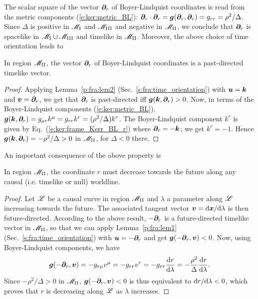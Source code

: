 The scalar square of the vector $\bm{\partial}_r$ of Boyer-Lindquist coordinates
is read from the metric components (\ref{e:ker:metric_BL}):
$\bm{\partial}_r \cdot \bm{\partial}_r = \bm{g}(\bm{\partial}_r,\bm{\partial}_r) = g_{rr} = \rho^2 / \Delta$. Since $\Delta$ is
positive in $\mathscr{M}_{\rm I}$ and $\mathscr{M}_{\rm III}$ and negative in $\M_{\rm II}$,
we conclude that $\bm{\partial}_r$ is spacelike in $\mathscr{M}_{\rm I}\cup \mathscr{M}_{\rm III}$
and timelike in $\M_{\rm II}$. Moreover, the above choice of time orientation leads to
\begin{prop}
In region $\M_{\rm II}$, the vector $\bm{\partial}_r$ of Boyer-Lindquist coordinates
is a past-directed timelike vector.
\end{prop}
\begin{proof}
Applying Lemma~\ref{p:fra:lem2} (Sec.~\ref{s:fra:time_orientation}) with $\bm{u}=\bm{k}$ and
$\bm{v} = \bm{\partial}_r$, we get that $\bm{\partial}_r$ is past-directed iff $\bm{g}(\bm{k},\bm{\partial}_r) > 0$.
Now, in terms of the Boyer-Lindquist components (\ref{e:ker:metric_BL}),
$\bm{g}(\bm{k},\bm{\partial}_r) = g_{\mu r} k^\mu = g_{rr} k^r = (\rho^2 / \Delta) k^r$.
The Boyer-Lindquist component $k^r$ is given by Eq.~(\ref{e:ker:frame_Kerr_BL_r}) where
$\bm{\partial}_{\hat{r}} = - \bm{k}$; we get $k^r = -1$. Hence $\bm{g}(\bm{k},\bm{\partial}_r) = - \rho^2 /\Delta > 0$
in $\M_{\rm II}$, for $\Delta < 0$ there.
\end{proof}

An important consequence of the above property is
\begin{prop}[decreasing of $r$ in $\M_{\rm II}$]
\label{p:ker:r_decreasing_M_II}
In region $\M_{\rm II}$, the coordinate $r$ must decrease towards the future
along any causal (i.e. timelike or null) worldline.
\end{prop}
\begin{proof}
Let $\mathscr{L}$ be a causal curve in region $\M_{\rm II}$ and $\lambda$ a parameter
along $\mathscr{L}$ increasing towards the future. The associated tangent vector
$\bm{v} = \mathrm{d}\bm{x}/\mathrm{d}\lambda$ is then future-directed.
According to the above result, $-\bm{\partial}_r$ is a future-directed timelike vector
in $\M_{\rm II}$, so that we can  apply Lemma~\ref{p:fra:lem1} (Sec.~\ref{s:fra:time_orientation})
with $\bm{u} = - \bm{\partial}_r$ and get $\bm{g}(-\bm{\partial}_r, \bm{v}) < 0$.
Now, using Boyer-Lindquist
components, we have
\[
    \bm{g}(-\bm{\partial}_r, \bm{v}) = - g_{r\mu} v^\mu = - g_{rr} v^r = - g_{rr} \frac{\mathrm{d} r}{\mathrm{d} \lambda}
    = - \frac{\rho^2}{\Delta} \frac{\mathrm{d} r}{\mathrm{d} \lambda} .
\]
Since $-\rho^2/\Delta > 0$ in $\M_{\rm II}$, $\bm{g}(-\bm{\partial}_r, \bm{v}) < 0$
is thus equivalent to $\mathrm{d} r/ \mathrm{d}\lambda < 0$, which proves that $r$ is decreasing
along $\mathscr{L}$ as $\lambda$ increases.
\end{proof}




